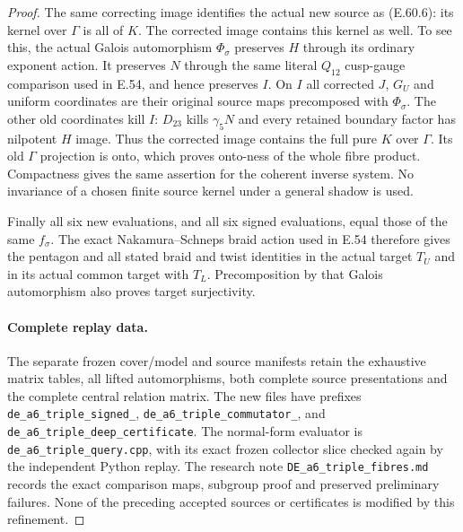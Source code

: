 \begin{proof}
The same correcting image identifies the actual new
source as \textup{(E.60.6)}: its kernel over $\Gamma$
is all of $K$. The corrected image contains this
kernel as well. To see this, the actual Galois
automorphism $\Phi_\sigma$ preserves $H$ through its
ordinary exponent action. It preserves $N$ through the
same literal $Q_{12}$ cusp-gauge comparison used in
E.54, and hence preserves $I$.
On $I$ all corrected $J$, $G_U$ and uniform coordinates
are their original source maps precomposed with
$\Phi_\sigma$. The other old coordinates kill $I$:
$D_{23}$ kills $\gamma_5N$ and every retained boundary
factor has nilpotent $H$ image.
Thus the corrected image contains the full pure $K$
over $\Gamma$. Its old $\Gamma$ projection is onto,
which proves onto-ness of the whole fibre product.
Compactness gives the same assertion for the coherent
inverse system. No invariance of a chosen finite source
kernel under a general shadow is used.

Finally all six new evaluations, and all six signed
evaluations, equal those of the same $f_\sigma$.
The exact Nakamura--Schneps braid action used in E.54
therefore gives the pentagon and all stated braid and
twist identities in the actual target $T_U$ and in its
actual common target with $T_L$. Precomposition by that
Galois automorphism also proves target surjectivity.

\paragraph{Complete replay data.}
The separate frozen cover/model and source manifests
retain the exhaustive matrix tables, all lifted
automorphisms, both complete source presentations and
the complete central relation matrix.
The new files have prefixes
\texttt{de\_a6\_triple\_signed\_},
\texttt{de\_a6\_triple\_commutator\_}, and
\texttt{de\_a6\_triple\_deep\_certificate}.
The normal-form evaluator is
\texttt{de\_a6\_triple\_query.cpp}, with its exact
frozen collector slice checked again by the independent
Python replay. The research note
\texttt{DE\_a6\_triple\_fibres.md} records the exact
comparison maps, subgroup proof and preserved preliminary
failures. None of the preceding accepted sources or
certificates is modified by this refinement.
\end{proof}
